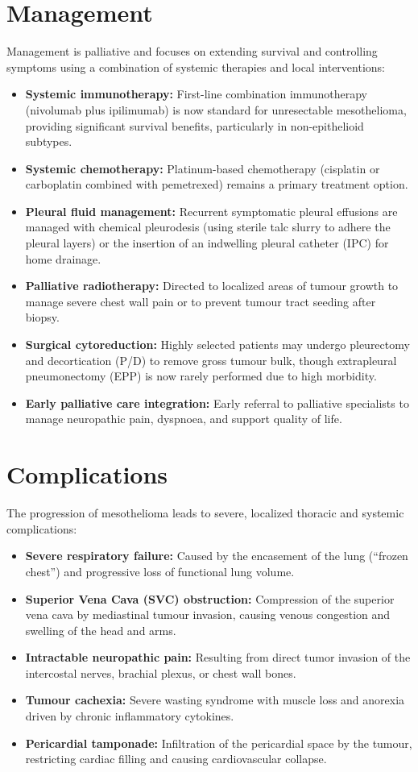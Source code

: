 \section*{Management}
Management is palliative and focuses on extending survival and controlling symptoms using a combination of systemic therapies and local interventions:
\begin{itemize}
    \item \textbf{Systemic immunotherapy:} First-line combination immunotherapy (nivolumab plus ipilimumab) is now standard for unresectable mesothelioma, providing significant survival benefits, particularly in non-epithelioid subtypes.
    \item \textbf{Systemic chemotherapy:} Platinum-based chemotherapy (cisplatin or carboplatin combined with pemetrexed) remains a primary treatment option.
    \item \textbf{Pleural fluid management:} Recurrent symptomatic pleural effusions are managed with chemical pleurodesis (using sterile talc slurry to adhere the pleural layers) or the insertion of an indwelling pleural catheter (IPC) for home drainage.
    \item \textbf{Palliative radiotherapy:} Directed to localized areas of tumour growth to manage severe chest wall pain or to prevent tumour tract seeding after biopsy.
    \item \textbf{Surgical cytoreduction:} Highly selected patients may undergo pleurectomy and decortication (P/D) to remove gross tumour bulk, though extrapleural pneumonectomy (EPP) is now rarely performed due to high morbidity.
    \item \textbf{Early palliative care integration:} Early referral to palliative specialists to manage neuropathic pain, dyspnoea, and support quality of life.
\end{itemize}

\section*{Complications}
The progression of mesothelioma leads to severe, localized thoracic and systemic complications:
\begin{itemize}
    \item \textbf{Severe respiratory failure:} Caused by the encasement of the lung (``frozen chest'') and progressive loss of functional lung volume.
    \item \textbf{Superior Vena Cava (SVC) obstruction:} Compression of the superior vena cava by mediastinal tumour invasion, causing venous congestion and swelling of the head and arms.
    \item \textbf{Intractable neuropathic pain:} Resulting from direct tumor invasion of the intercostal nerves, brachial plexus, or chest wall bones.
    \item \textbf{Tumour cachexia:} Severe wasting syndrome with muscle loss and anorexia driven by chronic inflammatory cytokines.
    \item \textbf{Pericardial tamponade:} Infiltration of the pericardial space by the tumour, restricting cardiac filling and causing cardiovascular collapse.
\end{itemize}

